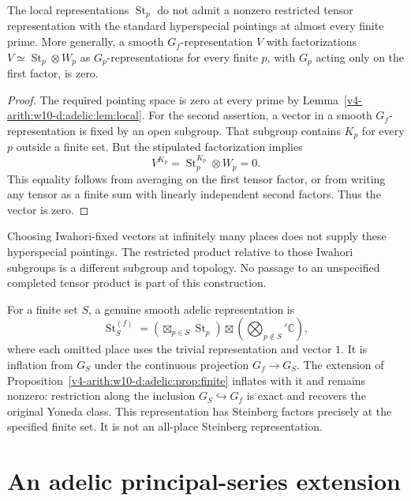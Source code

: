 \begin{proposition}\label{v4-arith:w10-d:adelic:prop:noall}
The local representations $\operatorname{St}_p$ do not admit a nonzero restricted
tensor representation with the standard hyperspecial pointings at almost
every finite prime. More generally, a smooth $G_f$-representation $V$
with factorizations $V\simeq\operatorname{St}_p\otimes W_p$ as $G_p$-representations
for every finite $p$, with $G_p$ acting only on the first factor, is zero.
\end{proposition}
\begin{proof}
The required pointing space is zero at every prime by
Lemma~\ref{v4-arith:w10-d:adelic:lem:local}. For the second assertion, a vector in a smooth
$G_f$-representation is fixed by an open subgroup. That subgroup contains
$K_p$ for every $p$ outside a finite set. But the stipulated factorization
implies
\[
 V^{K_p}=\operatorname{St}_p^{K_p}\otimes W_p=0.
\]
This equality follows from averaging on the first tensor factor, or from
writing any tensor as a finite sum with linearly independent second
factors. Thus the vector is zero.
\end{proof}

Choosing Iwahori-fixed vectors at infinitely many places does not supply
these hyperspecial pointings. The restricted product relative to those
Iwahori subgroups is a different subgroup and topology. No passage to
an unspecified completed tensor product is part of this construction.

For a finite set $S$, a genuine smooth adelic representation is
\[
 \operatorname{St}_S^{(f)}=\left(\boxtimes_{p\in S}\operatorname{St}_p\right)
               \boxtimes\left(\bigotimes_{p\notin S}'\mathbb C\right),
\]
where each omitted place uses the trivial representation and vector $1$.
It is inflation from $G_S$ under the continuous projection $G_f\to G_S$.
The extension of Proposition~\ref{v4-arith:w10-d:adelic:prop:finite} inflates with it and remains
nonzero: restriction along the inclusion $G_S\hookrightarrow G_f$ is
exact and recovers the original Yoneda class. This representation has
Steinberg factors precisely at the specified finite set. It is not an
all-place Steinberg representation.

\section{An adelic principal-series extension}

